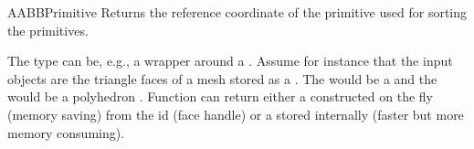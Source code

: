 \begin{ccRefConcept}{AABBPrimitive}
{Returns the  reference coordinate of the primitive used for sorting the primitives.}


\ccSeeAlso
{}

\ccExample

The  type can be, e.g., a wrapper around a . Assume for instance that the input objects are the triangle faces of a mesh stored as a . The  would be a  and the  would be a polyhedron . Function  can return either a  constructed on the fly (memory saving) from the id (face handle) or a  stored internally (faster but more memory consuming). 

\end{ccRefConcept}

\ccRefPageEnd

